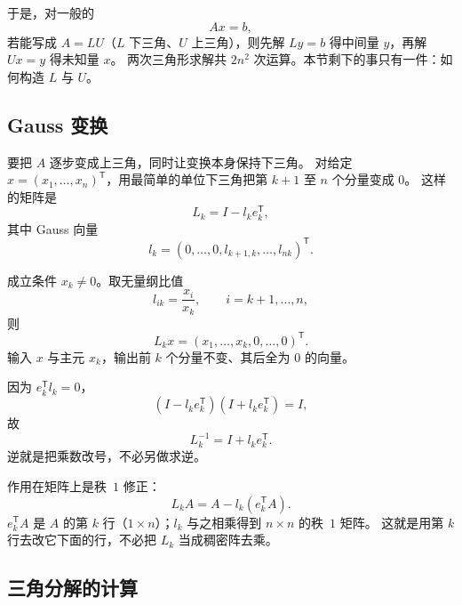 
于是，对一般的
\begin{equation}
Ax=b,
\end{equation}
若能写成 $A=LU$（$L$ 下三角、$U$ 上三角），则先解 $Ly=b$ 得中间量 $y$，再解 $Ux=y$ 得未知量 $x$。
两次三角形求解共 $2n^2$ 次运算。本节剩下的事只有一件：如何构造 $L$ 与 $U$。

\subsection{Gauss 变换}

要把 $A$ 逐步变成上三角，同时让变换本身保持下三角。
对给定 $x=(x_1,\ldots,x_n)^{\mathsf T}$，用最简单的单位下三角把第 $k+1$ 至 $n$ 个分量变成 $0$。
这样的矩阵是
\begin{equation}
L_k=I-l_k e_k^{\mathsf T},
\end{equation}
其中 Gauss 向量
\[
l_k=(0,\ldots,0,l_{k+1,k},\ldots,l_{nk})^{\mathsf T}.
\]


成立条件 $x_k\neq 0$。取无量纲比值
\begin{equation}
l_{ik}=\frac{x_i}{x_k},\qquad i=k+1,\ldots,n,
\end{equation}
则
\begin{equation}
L_k x=(x_1,\ldots,x_k,0,\ldots,0)^{\mathsf T}.
\end{equation}
输入 $x$ 与主元 $x_k$，输出前 $k$ 个分量不变、其后全为 $0$ 的向量。

因为 $e_k^{\mathsf T}l_k=0$，
\[
(I-l_k e_k^{\mathsf T})(I+l_k e_k^{\mathsf T})=I,
\]
故
\begin{equation}
L_k^{-1}=I+l_k e_k^{\mathsf T}.
\end{equation}
逆就是把乘数改号，不必另做求逆。

作用在矩阵上是秩~$1$ 修正：
\begin{equation}
L_k A=A-l_k(e_k^{\mathsf T}A).
\end{equation}
$e_k^{\mathsf T}A$ 是 $A$ 的第 $k$ 行（$1\times n$）；$l_k$ 与之相乘得到 $n\times n$ 的秩~$1$ 矩阵。
这就是用第 $k$ 行去改它下面的行，不必把 $L_k$ 当成稠密阵去乘。

\subsection{三角分解的计算}

